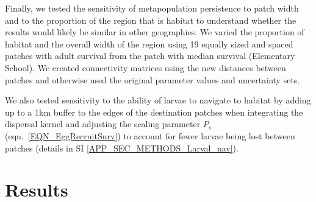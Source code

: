 \documentclass[12pt, oneside]{article}   	%
\begin{document}
Finally, we tested the sensitivity of metapopulation persistence to patch width and to the proportion of the region that is habitat to understand whether the results would likely be similar in other geographies. We varied the proportion of habitat and the overall width of the region using 19 equally sized and spaced patches with adult survival from the patch with median survival (Elementary School). We created connectivity matrices using the new distances between patches and otherwise used the original parameter values and uncertainty sets. 

We also tested sensitivity to the ability of larvae to navigate to habitat by adding up to a 1km buffer to the edges of the destination patches when integrating the dispersal kernel and adjusting the scaling parameter $P_s$ (eqn.\ \ref{EQN_EggRecruitSurv}) to account for fewer larvae being lost between patches (details in SI \ref{APP_SEC_METHODS_Larval_nav}).

\section*{Results}  


\end{document}
